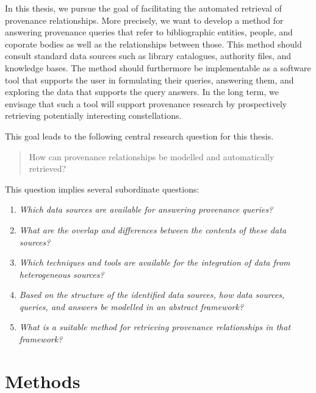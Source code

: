 In this thesis, we pursue the goal of facilitating
the automated retrieval of provenance relationships.
More precisely,
we want to develop a method for answering provenance queries that refer to bibliographic entities, people, and coporate bodies
as well as the relationships between those. This method should consult standard data sources such as 
library catalogues, authority files, and knowledge bases. The method should furthermore be implementable as a software tool
that supports the user in formulating their queries, answering them, and exploring the data that supports the query answers.
In the long term, we envisage that such a tool will support provenance research
by prospectively retrieving potentially interesting constellations.

This goal leads to the following
central research question for this thesis.
%
\begin{quote}
  \begin{itshape}
    How can provenance relationships be modelled and automatically retrieved?
  \end{itshape}
\end{quote}
%  
This question implies several subordinate questions:
%
\begin{enumerate}
  \item[\subquestion{1}]
    \emph{Which data sources are available for answering provenance queries?}
  \item[\subquestion{2}]
    \emph{What are the overlap and differences between the contents of these data sources?}
  \item[\subquestion{3}]
    \emph{Which techniques and tools are available for the integration
    of data from heterogeneous sources?}
  \item[\subquestion{4}]
    \emph{Based on the structure of the identified data sources,
    how data sources, queries, and answers be modelled in an abstract framework?}
  \item[\subquestion{5}]
    \emph{What is a suitable method for retrieving provenance relationships
    in that framework?}
\end{enumerate}


\section{Methods}
\label{sec:methods}



